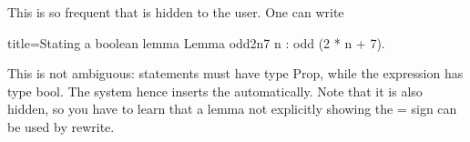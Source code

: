 This is so frequent that  is hidden to the user.
One can write

\begin{coq}{title=Stating a boolean lemma}
Lemma odd2n7 n : odd (2 * n + 7).
\end{coq}

This is not ambiguous: statements must have type Prop, while
the expression has type bool.  The system hence inserts
the  automatically.  Note that it is also hidden,
so you have to learn that a lemma not explicitly showing the
= sign can be used by rewrite.

% 
